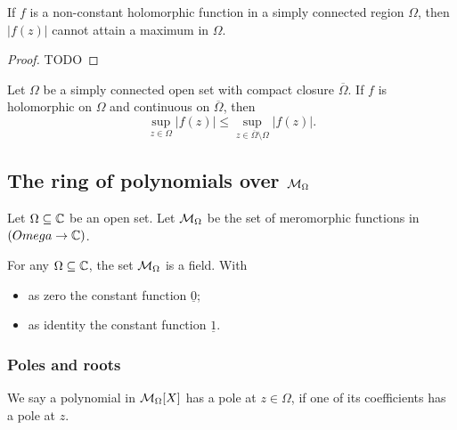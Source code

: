 \begin{proposition}
If $f$ is a non-constant holomorphic function in a simply connected region $\Omega$, then $|f(z)|$ cannot attain a maximum in $\Omega$.
\end{proposition}
\begin{proof}
TODO
\end{proof}
\begin{corollary}
Let $\Omega$ be a simply connected open set with compact closure $\overline{\Omega}$. If $f$ is holomorphic on $\Omega$ and continuous on $\overline{\Omega}$, then
\[ \sup_{z\in \Omega}|f(z)| \leq \sup_{z\in \overline{\Omega}\setminus\Omega}|f(z)|. \]
\end{corollary}

\subsection{The ring of polynomials over $\operatorname{\mathcal{M}}_\Omega$}

\begin{definition}
Let $\Omega\subseteq \mathbb{C}$ be an open set. Let $\operatorname{\mathcal{M}}_\Omega$ be the set of meromorphic functions in $(Omega \to \mathbb{C})$.
\end{definition}

\begin{proposition}
For any $\Omega \subseteq \mathbb{C}$, the set $\operatorname{\mathcal{M}}_\Omega$ is a field. With
\begin{itemize}
\item as zero the constant function $\underline{0}$;
\item as identity the constant function $\underline{1}$.
\end{itemize}
\end{proposition}

\subsubsection{Poles and roots}
\begin{definition}
We say a polynomial in $\operatorname{\mathcal{M}}_\Omega[X]$ has a pole at $z\in \Omega$, if one of its coefficients has a pole at $z$.
\end{definition}

